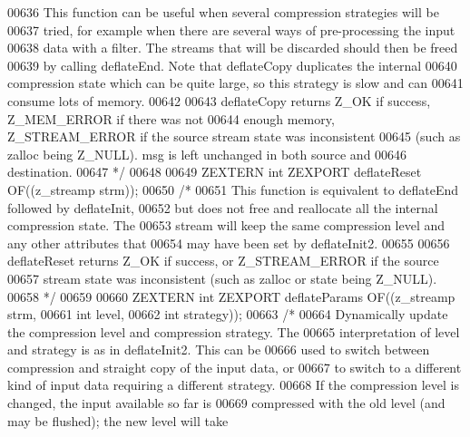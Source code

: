 \begin{DoxyCode}
00636 \textcolor{comment}{     This function can be useful when several compression strategies will be}
00637 \textcolor{comment}{   tried, for example when there are several ways of pre-processing the input}
00638 \textcolor{comment}{   data with a filter.  The streams that will be discarded should then be freed}
00639 \textcolor{comment}{   by calling deflateEnd.  Note that deflateCopy duplicates the internal}
00640 \textcolor{comment}{   compression state which can be quite large, so this strategy is slow and can}
00641 \textcolor{comment}{   consume lots of memory.}
00642 \textcolor{comment}{}
00643 \textcolor{comment}{     deflateCopy returns Z\_OK if success, Z\_MEM\_ERROR if there was not}
00644 \textcolor{comment}{   enough memory, Z\_STREAM\_ERROR if the source stream state was inconsistent}
00645 \textcolor{comment}{   (such as zalloc being Z\_NULL).  msg is left unchanged in both source and}
00646 \textcolor{comment}{   destination.}
00647 \textcolor{comment}{*/}
00648 
00649 ZEXTERN \textcolor{keywordtype}{int} ZEXPORT deflateReset OF((z\_streamp strm));
00650 \textcolor{comment}{/*}
00651 \textcolor{comment}{     This function is equivalent to deflateEnd followed by deflateInit,}
00652 \textcolor{comment}{   but does not free and reallocate all the internal compression state.  The}
00653 \textcolor{comment}{   stream will keep the same compression level and any other attributes that}
00654 \textcolor{comment}{   may have been set by deflateInit2.}
00655 \textcolor{comment}{}
00656 \textcolor{comment}{     deflateReset returns Z\_OK if success, or Z\_STREAM\_ERROR if the source}
00657 \textcolor{comment}{   stream state was inconsistent (such as zalloc or state being Z\_NULL).}
00658 \textcolor{comment}{*/}
00659 
00660 ZEXTERN \textcolor{keywordtype}{int} ZEXPORT deflateParams OF((z\_streamp strm,
00661                                       \textcolor{keywordtype}{int} level,
00662                                       \textcolor{keywordtype}{int} strategy));
00663 \textcolor{comment}{/*}
00664 \textcolor{comment}{     Dynamically update the compression level and compression strategy.  The}
00665 \textcolor{comment}{   interpretation of level and strategy is as in deflateInit2.  This can be}
00666 \textcolor{comment}{   used to switch between compression and straight copy of the input data, or}
00667 \textcolor{comment}{   to switch to a different kind of input data requiring a different strategy.}
00668 \textcolor{comment}{   If the compression level is changed, the input available so far is}
00669 \textcolor{comment}{   compressed with the old level (and may be flushed); the new level will take}

\end{DoxyCode}
